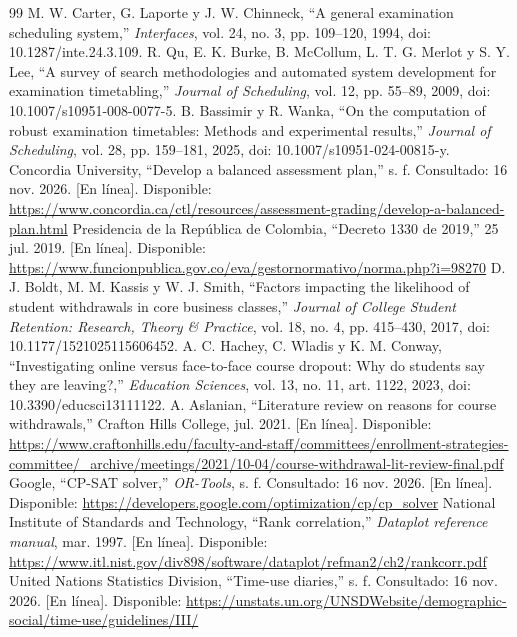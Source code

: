 \documentclass[conference]{IEEEtran}
\begin{document}
\begin{thebibliography}{99}
 M. W. Carter, G. Laporte y J. W. Chinneck, ``A general examination scheduling system,'' \emph{Interfaces}, vol. 24, no. 3, pp. 109--120, 1994, doi: 10.1287/inte.24.3.109.
 R. Qu, E. K. Burke, B. McCollum, L. T. G. Merlot y S. Y. Lee, ``A survey of search methodologies and automated system development for examination timetabling,'' \emph{Journal of Scheduling}, vol. 12, pp. 55--89, 2009, doi: 10.1007/s10951-008-0077-5.
 B. Bassimir y R. Wanka, ``On the computation of robust examination timetables: Methods and experimental results,'' \emph{Journal of Scheduling}, vol. 28, pp. 159--181, 2025, doi: 10.1007/s10951-024-00815-y.
 Concordia University, ``Develop a balanced assessment plan,'' s. f. Consultado: 16 nov. 2026. [En línea]. Disponible: \url{https://www.concordia.ca/ctl/resources/assessment-grading/develop-a-balanced-plan.html}
 Presidencia de la República de Colombia, ``Decreto 1330 de 2019,'' 25 jul. 2019. [En línea]. Disponible: \url{https://www.funcionpublica.gov.co/eva/gestornormativo/norma.php?i=98270}
 D. J. Boldt, M. M. Kassis y W. J. Smith, ``Factors impacting the likelihood of student withdrawals in core business classes,'' \emph{Journal of College Student Retention: Research, Theory \& Practice}, vol. 18, no. 4, pp. 415--430, 2017, doi: 10.1177/1521025115606452.
 A. C. Hachey, C. Wladis y K. M. Conway, ``Investigating online versus face-to-face course dropout: Why do students say they are leaving?,'' \emph{Education Sciences}, vol. 13, no. 11, art. 1122, 2023, doi: 10.3390/educsci13111122.
 A. Aslanian, ``Literature review on reasons for course withdrawals,'' Crafton Hills College, jul. 2021. [En línea]. Disponible: \url{https://www.craftonhills.edu/faculty-and-staff/committees/enrollment-strategies-committee/_archive/meetings/2021/10-04/course-withdrawal-lit-review-final.pdf}
 Google, ``CP-SAT solver,'' \emph{OR-Tools}, s. f. Consultado: 16 nov. 2026. [En línea]. Disponible: \url{https://developers.google.com/optimization/cp/cp_solver}
 National Institute of Standards and Technology, ``Rank correlation,'' \emph{Dataplot reference manual}, mar. 1997. [En línea]. Disponible: \url{https://www.itl.nist.gov/div898/software/dataplot/refman2/ch2/rankcorr.pdf}
 United Nations Statistics Division, ``Time-use diaries,'' s. f. Consultado: 16 nov. 2026. [En línea]. Disponible: \url{https://unstats.un.org/UNSDWebsite/demographic-social/time-use/guidelines/III/}

\end{thebibliography}
\end{document}
